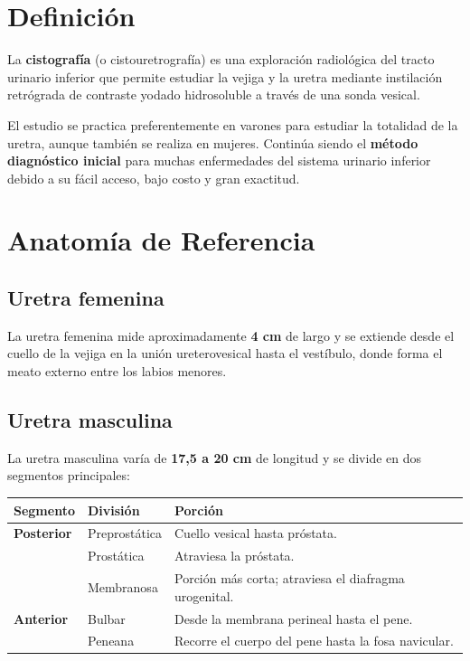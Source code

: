 \section*{Definición}

\begin{cajadefinicion}
La \textbf{cistografía} (o cistouretrografía) es una exploración radiológica del tracto urinario inferior que permite estudiar la vejiga y la uretra mediante instilación retrógrada de contraste yodado hidrosoluble a través de una sonda vesical.
\end{cajadefinicion}

El estudio se practica preferentemente en varones para estudiar la totalidad de la uretra, aunque también se realiza en mujeres. Continúa siendo el \textbf{método diagnóstico inicial} para muchas enfermedades del sistema urinario inferior debido a su fácil acceso, bajo costo y gran exactitud.

\section*{Anatomía de Referencia}

\subsection*{Uretra femenina}

La uretra femenina mide aproximadamente \textbf{4 cm} de largo y se extiende desde el cuello de la vejiga en la unión ureterovesical hasta el vestíbulo, donde forma el meato externo entre los labios menores.

\subsection*{Uretra masculina}

La uretra masculina varía de \textbf{17,5 a 20 cm} de longitud y se divide en dos segmentos principales:

{\renewcommand{\arraystretch}{1.35}
\begin{center}
\begin{tabular}{>{\bfseries}p{3cm} p{4cm} p{6.5cm}}
\hline
Segmento & División & Porción \\
\hline
Posterior & Preprostática & Cuello vesical hasta próstata. \\[0.3em]
\hline
          & Prostática     & Atraviesa la próstata. \\[0.3em]
\hline
          & Membranosa     & Porción más corta; atraviesa el diafragma urogenital. \\[0.5em]
\hline
Anterior  & Bulbar         & Desde la membrana perineal hasta el pene. \\[0.3em]
\hline
          & Peneana        & Recorre el cuerpo del pene hasta la fosa navicular. \\
\hline
\end{tabular}
\end{center} 
}

